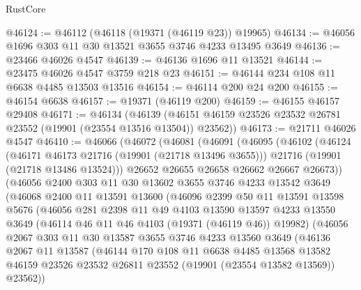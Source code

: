 \begin{lexlean}{RustCore}
\begin{coremodule}
@46124 := @46112 (@46118 (@19371 (@46119 @23)) @19965)
@46134 := @46056 @1696 @303 @11 @30 @13521 @3655 @3746 @4233 @13495 @3649
@46136 := @23466 @46026 @4547
@46139 := @46136 @1696 @11 @13521
@46144 := @23475 @46026 @4547 @3759 @218 @23
@46151 := @46144 @234 @108 @11 @6638 @4485 @13503 @13516
@46154 := @46114 @200 @24 @200
@46155 := @46154 @6638
@46157 := @19371 (@46119 @200)
@46159 := @46155 @46157 @29408
@46171 := @46134
    (@46139 (@46151 @46159 @23526 @23532 @26781 @23552 (@19901 (@23554 @13516 @13504)) @23562))
@46173 := @21711 @46026 @4547
@46410 := @46066
    (@46072
      (@46081
        (@46091
          (@46095
            (@46102
              (@46124
                (@46171 @46173 @21716 (@19901 (@21718 @13496 @3655)))
                @21716
                (@19901 (@21718 @13486 @13524)))
              @26652
              @26655
              @26658
              @26662
              @26667
              @26673))
          (@46056
            @2400
            @303
            @11
            @30
            @13602
            @3655
            @3746
            @4233
            @13542
            @3649
            (@46068
              @2400
              @11
              @13591
              @13600
              (@46096
                @2399
                @50
                @11
                @13591
                @13598
                @5676
                (@46056
                  @281
                  @2398
                  @11
                  @49
                  @4103
                  @13590
                  @13597
                  @4233
                  @13550
                  @3649
                  (@46114 @46 @11 @46 @4103 (@19371 (@46119 @46)) @19982)
                  (@46056
                    @2067
                    @303
                    @11
                    @30
                    @13587
                    @3655
                    @3746
                    @4233
                    @13560
                    @3649
                    (@46136
                      @2067
                      @11
                      @13587
                      (@46144
                        @170
                        @108
                        @11
                        @6638
                        @4485
                        @13568
                        @13582
                        @46159
                        @23526
                        @23532
                        @26811
                        @23552
                        (@19901 (@23554 @13582 @13569))
                        @23562))

\end{coremodule}
\end{lexlean}
